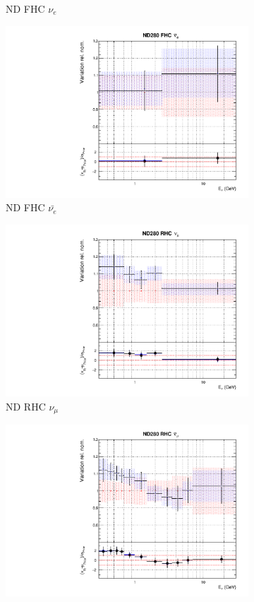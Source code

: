 \begin{figure}[!htbp]
\begin{subfigure}{0.45\textwidth}
  \caption{ND FHC $\nu_{e}$}
\end{subfigure}
\begin{subfigure}{0.45\textwidth}
  \centering
  \includegraphics[width=0.75\linewidth]{figs/jointflux3}
  \caption{ND FHC $\bar{\nu_{e}}$}
\end{subfigure}
\begin{subfigure}{0.45\textwidth}
  \centering
  \includegraphics[width=0.75\linewidth]{figs/jointflux4}
  \caption{ND RHC $\nu_{\mu}$}
\end{subfigure}
\begin{subfigure}{0.45\textwidth}
  \centering
  \includegraphics[width=0.75\linewidth]{figs/jointflux5}

\end{subfigure}
\end{figure}
